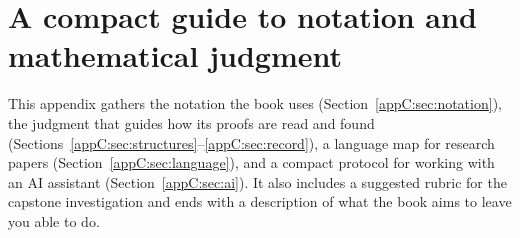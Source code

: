 \chapter{A compact guide to notation and mathematical judgment}\label{app:guide}
This appendix gathers the notation the book uses (Section~\ref{appC:sec:notation}), the judgment that guides how its proofs are read and found (Sections~\ref{appC:sec:structures}--\ref{appC:sec:record}), a language map for research papers (Section~\ref{appC:sec:language}), and a compact protocol for working with an AI assistant (Section~\ref{appC:sec:ai}). It also includes a suggested rubric for the capstone investigation and ends with a description of what the book aims to leave you able to do.










